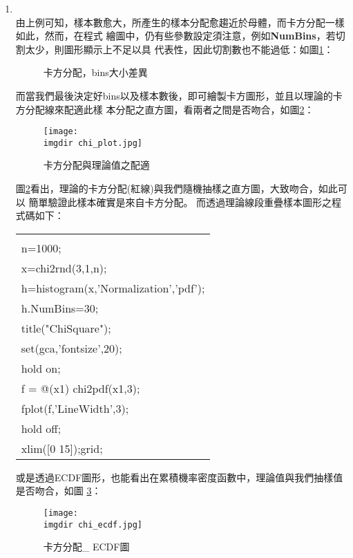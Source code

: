 \begin{enumerate}
		\item{\textbf{}\\
			由上例可知，樣本數愈大，所產生的樣本分配愈趨近於母體，而卡方分配一樣如此，然而，在程式				繪圖中，仍有些參數設定須注意，例如\textbf{NumBins}，若切割太少，則圖形顯示上不足以具				代表性，因此切割數也不能過低：如圖\ref{chi_hist_bin}：
			\begin{figure}[H]	
		 		 \centering	 			 	 
   			 	 \caption{卡方分配，bins大小差異}   		
   			 	 \label{chi_hist_bin}   			 		 
			\end{figure}
			而當我們最後決定好bins以及樣本數後，即可繪製卡方圖形，並且以理論的卡方分配線來配適此樣				本分配之直方圖，看兩者之間是否吻合，如圖\ref{chi_plot}：
			\begin{figure}[H]	
		 		 \centering	 			 	 
   				 \texttt{[image: \\imgdir chi\_plot.jpg]} 
   			 	 \caption{卡方分配與理論值之配適}   		
   			 	 \label{chi_plot}   			 		 
			\end{figure}			
			圖\ref{chi_plot}看出，理論的卡方分配(紅線)與我們隨機抽樣之直方圖，大致吻合，如此可以				簡單驗證此樣本確實是來自卡方分配。
			而透過理論線段重疊樣本圖形之程式碼如下：
			\begin{center}\colorbox{slight}{
				\begin{tabular}{p{}}
					\MJHmarker{\textbf{\color{darkblue}{MATLAB語法 :}}}\\		
					n=1000;\\
					x=chi2rnd(3,1,n);\\
					h=histogram(x,'Normalization','pdf');\\
					h.NumBins=30;\\					
					title("ChiSquare");   \\
					set(gca,'fontsize',20);\\
					hold on;\\
					f = @(x1) chi2pdf(x1,3);\\
					fplot(f,'LineWidth',3);\\
					hold off;\\
					xlim([0 15]);grid;\\
				\end{tabular}
			}
			\end{center}
			或是透過ECDF圖形，也能看出在累積機率密度函數中，理論值與我們抽樣值是否吻合，如圖					\ref{chi_ecdf}：
			\begin{figure}[H]	
		 		 \centering	 			 	 
   				 \texttt{[image: \\imgdir chi\_ecdf.jpg]} 
   			 	 \caption{卡方分配\_ ECDF圖}   		
   			 	 \label{chi_ecdf}   			 		 
			\end{figure}
			
}
\end{enumerate}
